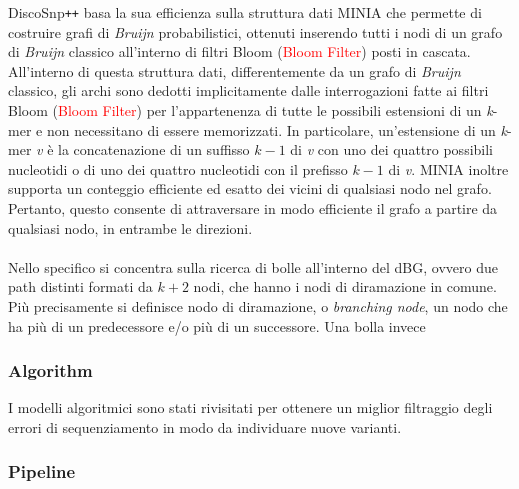 \documentclass[../main.tex]{subfiles}
\begin{document}
DiscoSnp\texttt{++} basa la sua efficienza sulla struttura dati \textsc{MINIA} \cite{chikhi2013space} che permette di costruire grafi di \textit{Bruijn} probabilistici, ottenuti inserendo tutti i nodi di un grafo di \textit{Bruijn} classico all'interno di filtri Bloom (\textcolor{red}{Bloom Filter}) posti in cascata. All'interno di questa struttura dati, differentemente da un grafo di \textit{Bruijn} classico, gli archi sono dedotti implicitamente dalle interrogazioni fatte ai filtri Bloom (\textcolor{red}{Bloom Filter}) per l'appartenenza di tutte le possibili estensioni di un \textit{k}-mer e non necessitano di essere memorizzati. In particolare, un'estensione di un \textit{k}-mer \textit{v} è la concatenazione di un suffisso $\textit{k}-1$ di \textit{v} con uno dei quattro possibili nucleotidi o di uno dei quattro nucleotidi con il prefisso  $\textit{k}-1$ di \textit{v}. \textsc{MINIA} inoltre supporta un conteggio efficiente ed esatto dei vicini di qualsiasi nodo nel grafo. Pertanto, questo consente di attraversare in modo efficiente il grafo a partire da qualsiasi nodo, in entrambe le direzioni.

\paragraph{}
Nello specifico si concentra sulla ricerca di bolle all'interno del dBG, ovvero due path distinti formati da $k+2$ nodi, che hanno i nodi di diramazione in comune. Più precisamente si definisce nodo di diramazione, o \textit{branching node}, un nodo che ha più di un predecessore e/o più di un successore. Una bolla invece

\subsubsection{Algorithm}

I modelli algoritmici sono stati rivisitati per ottenere un miglior filtraggio degli errori di sequenziamento in modo da individuare nuove varianti.

\subsubsection{Pipeline}
\end{document}
